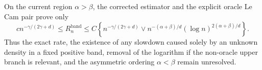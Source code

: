 On the current region \(\alpha>\beta\), the corrected estimator and the explicit oracle Le Cam pair prove only
\[
c n^{-\gamma/(2\gamma+d)}
\le R_n^{\mathrm{band}}
\le C\left\{n^{-\gamma/(2\gamma+d)}\vee
n^{-(\alpha+\beta)/d}(\log n)^{2(\alpha+\beta)/d}\right\}.
\]
Thus the exact rate, the existence of any slowdown caused solely by an unknown density in a fixed positive band, removal of the logarithm if the non-oracle upper branch is relevant, and the asymmetric ordering \(\alpha<\beta\) remain unresolved.
